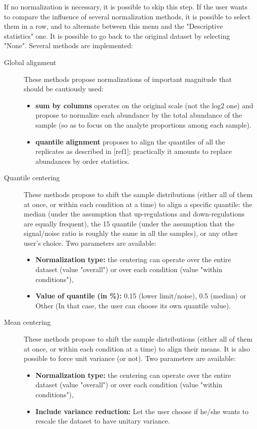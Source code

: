 \documentclass[12pt]{article}
\begin{document}
{If no normalization is necessary, it is possible to skip this step.
If the user wants to compare the influence of several normalization methods, 
it is possible to select them in a row, and to alternate between this menu 
and the "Descriptive statistics" one. It is possible to go back to the 
original dataset by selecting "None".
Several methods are implemented:
\begin {description}
\item[Global alignment]
These methods propose normalizations of important magnitude that should be 
cautiously used:
\begin{itemize}
\item \textbf{sum by columns} operates on the original scale (not the log2 one) 
and propose to normalize each abundance by the total abundance of the sample 
(so as to focus on the analyte proportions among each sample).
\item \textbf{quantile alignment} proposes to align the quantiles of all the 
replicates as described in [ref1]; practically it amounts to replace abundances 
by order statistics.\newline
\end{itemize}


\item[Quantile centering]
These methods propose to shift the sample distributions (either all of them at 
once, or within each condition at a time) to align a specific quantile: the 
median (under the assumption that up-regulations and down-regulations are 
equally frequent), the 15 quantile (under the assumption that the signal/noise 
ratio is roughly the same in all the samples), or any other user's choice. 
Two parameters are available:
\begin{itemize}
\item \textbf{Normalization type: } the centering can operate over the entire 
dataset (value "overall") or over each condition (value "within conditions"),
\item \textbf{Value of quantile (in \%): } 0.15 (lower limit/noise), 
0.5 (median) or Other (In that case, the user can choose its own quantile 
value).\newline
\end{itemize}


\item[Mean centering]
These methods propose to shift the sample distributions (either all of them at 
once, or within each condition at a time) to align their means. It is also 
possible to force unit variance (or not). Two parameters are available:
\begin{itemize}
\item \textbf{Normalization type:} the centering can operate over the entire 
dataset (value "overall") or over each condition (value "within conditions"),
\item \textbf{Include variance reduction:} Let the user choose if he/she wants 
to rescale the dataset to have unitary variance.
\end{itemize}


\end{description}}
\end{document}
